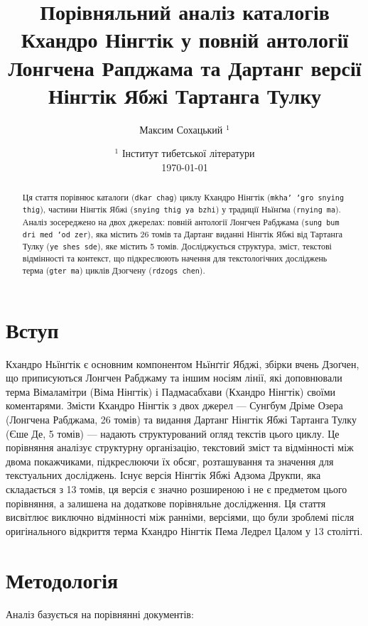 \documentclass{article}
\title{  Порівняльний аналіз
         каталогів Кхандро Нінгтік
         у повній антології Лонгчена Рапджама
         та Дартанг версії Нінгтік Ябжі Тартанга Тулку}
\author{ Максим Сохацький $^1$ }
\date{   $^1$ Інститут тибетської літератури \\
         \today }
\begin{document}
\maketitle

\begin{abstract}
Ця стаття порівнює каталоги (\texttt{dkar chag}) циклу Кхандро Нінгтік (\texttt{mkha' 'gro snying thig}),
частини Нінгтік Ябжі (\texttt{snying thig ya bzhi}) у традиції Ньїнґма (\texttt{rnying ma}). Аналіз зосереджено на двох
джерелах: повній антології Лонгчен Рабджама (\texttt{sung bum dri med 'od zer}), яка містить 26 томів
та Дартанг виданні Нінгтік Ябжі від Тартанга Тулку (\texttt{ye shes sde}), яке містить 5 томів.
Досліджується структура, зміст, текстові відмінності та контекст, що підкреслюють
начення для текстологічних досліджень терма (\texttt{gter ma}) циклів Дзогчену (\texttt{rdzogs chen}).
\end{abstract}


\newpage
\tableofcontents

\newpage

\section{Вступ}

Кхандро Ньїнґтік є основним компонентом Ньїнґтіґ Ябджі, збірки вчень Дзоґчен,
що приписуються Лонгчен Рабджаму та іншим носіям лінії, які доповнювали терма
Вімаламітри (Віма Нінгтік) і Падмасабхави (Кхандро Нінгтік) своїми коментарями.
Змісти Кхандро Нінгтік з двох джерел — Сунгбум Дріме Озера (Лонгчена Рабджама, 26 томів) та видання
Дартанг Нінгтік Ябжі Тартанга Тулку (Єше Де, 5 томів) — надають структурований огляд текстів цього циклу.
Це порівняння аналізує структурну організацію, текстовий зміст та відмінності між
двома покажчиками, підкреслюючи їх обсяг, розташування та значення для текстуальних досліджень.
Існує версія Нінгтік Ябжі Адзома Друкпи, яка складається з 13 томів, ця версія є значно розширеною
і не є предметом цього порівняння, а залишена на додаткове порівняльне дослідження. Ця стаття
висвітлює виключно відмінності між ранніми, версіями, що були зроблемі після оригінального відкриття
терма Кхандро Нінгтік Пема Ледрел Цалом у 13 столітті.

\section{Методологія}
Аналіз базується на порівнянні документів:
\end{document}
